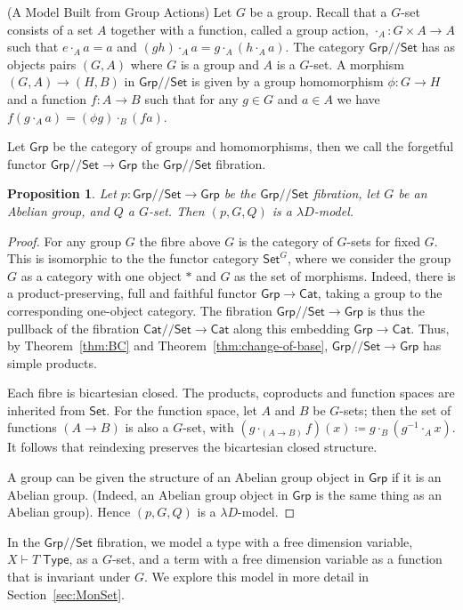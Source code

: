 \documentclass[a4paper,UKenglish]{lipics}
\newtheorem{proposition}[theorem]{Proposition}
\newcommand{\msf}[1]{\mathsf{#1}} %
\newcommand{\Grp}{\msf{Grp}}
\newcommand{\Set}{\msf{Set}}
\newcommand{\Cat}{\msf{Cat}}
\newcommand{\GroupSet}[1]{#1/\!/\Set}
\newcommand{\GrpSet}{\GroupSet{\Grp}}
\newcommand{\CatSet}{\GroupSet{\Cat}}
\newcommand{\Tj}[2]{#1 \vdash #2 \; \msf{ Type}}
\newcommand{\Dvar}{X}
\begin{document}
\begin{example}(A Model Built from Group Actions)
\label{ex:MonAct}
Let $G$ be a group. Recall that a $G$-set consists of a set $A$ together with a function, called a group action, $\cdot_A:G\times A\to A$ such that $e\cdot_{A} a=a$ and $(gh)\cdot_A a=g\cdot_A (h\cdot_A a)$. The category $\GrpSet$ has as objects pairs $(G,A)$ where $G$ is a group and $A$ is a $G$-set. A morphism $(G,A) \rightarrow (H,B)$ in $\GrpSet$ is given by a group homomorphism $\phi:G\rightarrow H$ and a function $f:A \rightarrow B$ such that for any $g\in G$ and $a\in A$ we have $f (g\cdot_A a) = (\phi g)\cdot_B (f a)$.

Let $\Grp$ be the category of groups and homomorphisms, then we call the forgetful functor $\GrpSet\to \Grp$ the $\GrpSet$ fibration.

\begin{proposition}
Let $p:\GrpSet \rightarrow \Grp$ be the $\GrpSet$ fibration, let $G$ be an Abelian group, and $Q$ a $G$-set. Then $(p,G,Q)$ is a $\lambda D$-model.
\end{proposition}

\begin{proof}
For any group $G$ the fibre above $G$ is the category of $G$-sets for fixed $G$.
This is isomorphic to the
the functor category ${\Set}^G$,
where we consider the group $G$ as a category with one object $*$
and $G$ as the set of morphisms.
Indeed, there is a product-preserving, full and faithful functor $\Grp\to\Cat$,
taking a group to the corresponding one-object category.
The fibration $\GrpSet\to\Grp$ is thus the pullback of
the fibration $\CatSet\to\Cat$ along this embedding $\Grp \to \Cat$.
Thus, by Theorem~\ref{thm:BC} and Theorem~\ref{thm:change-of-base},
$\GrpSet\to\Grp$ has simple products.

Each fibre is bicartesian closed.
The products, coproducts and function spaces are inherited from $\Set$.
For the function space, let $A$ and $B$ be $G$-sets;
then the set of functions $(A\to B)$ is also a $G$-set,
with $(g\cdot_{(A\to B)}f)(x)\coloneqq g\cdot_B(g^{-1}\cdot_A x)$.
It follows that reindexing preserves the bicartesian closed structure.

A group can be given the structure of an Abelian group object in $\Grp$ if it is an Abelian group. (Indeed, an Abelian group object in $\Grp$ is the same thing as an Abelian group). Hence $(p,G,Q)$ is a $\lambda D$-model.
\end{proof}

In the $\GrpSet$ fibration, we model a type with a free dimension variable, $\Tj\Dvar T$, as a $G$-set, and a term with a free dimension variable as a function that is invariant under $G$. We explore this model in more detail in Section~\ref{sec:MonSet}.
\end{example}
\end{document}
